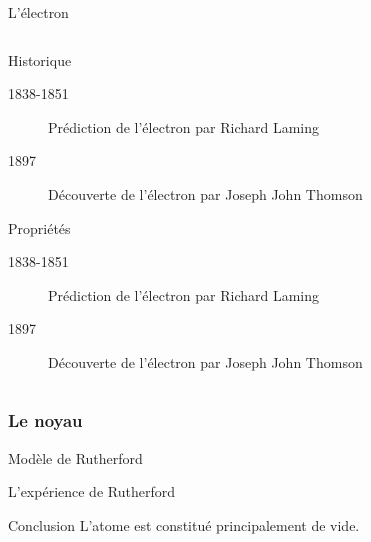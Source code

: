 \documentclass[handout,8pt]{beamer} %
\begin{document}
\begin{frame}{L'électron}

	\begin{columns}
		\begin{column}{0.7\textwidth}
		
			\begin{block}{Historique}
				\begin{description}
					\item[1838-1851] Prédiction de l'électron par Richard Laming 
					\item[1897] Découverte de l'électron par Joseph John Thomson
				\end{description}
			\end{block}

			\begin{block}{Propriétés}
				\begin{description}
					\item[1838-1851] Prédiction de l'électron par Richard Laming 
					\item[1897] Découverte de l'électron par Joseph John Thomson
				\end{description}
			\end{block}

		\end{column}
		\begin{column}{0.25\textwidth}
			
		\end{column}
	\end{columns}
\end{frame}

\subsubsection{Le noyau}
\begin{frame}{Modèle de Rutherford}

	\begin{block}{L'expérience de Rutherford}
	\end{block}

	\begin{block}{Conclusion}
		L'atome est constitué principalement de vide.
	\end{block}

\end{frame}
\end{document}
